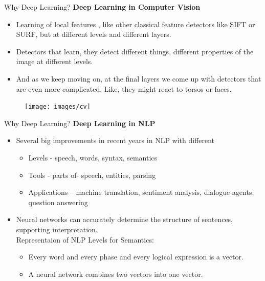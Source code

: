 \documentclass[10pt]{beamer}
\begin{document}
	\begin{frame}[c]{Why Deep Learning?}
		\textbf{Deep Learning in Computer Vision}
		\begin{itemize}
			\item Learning of local features , like other classical feature detectors like SIFT or SURF, but at different levels and different layers.
			\item Detectors that learn, they detect different things, different properties of the image at different levels.
			\item And as we keep moving on, at the final layers we come up with detectors that are even more
			complicated. Like, they might react to torsos or faces.
		\end{itemize}
		\begin{figure}
			\texttt{[image: images/cv]}
		\end{figure}
	\end{frame}
	\begin{frame}[c]{Why Deep Learning?}
		\textbf{Deep Learning in NLP}
		\begin{itemize}
			\item Several big improvements in recent years in NLP with different
				\begin{itemize}
					\item Levels - speech, words, syntax, semantics
					\item Tools - parts of- speech, entities, parsing
					\item Applications – machine translation, sentiment analysis, dialogue agents, question answering
				\end{itemize}
			\item Neural networks can accurately determine the structure of sentences, supporting interpretation.\\
			Representaion of NLP Levels for Semantics:
				\begin{itemize}
					\item Every word and every phase and every logical expression is a vector.
					\item A neural network combines two vectors into one vector.
				\end{itemize}
		\end{itemize}
	\end{frame}
\end{document}

